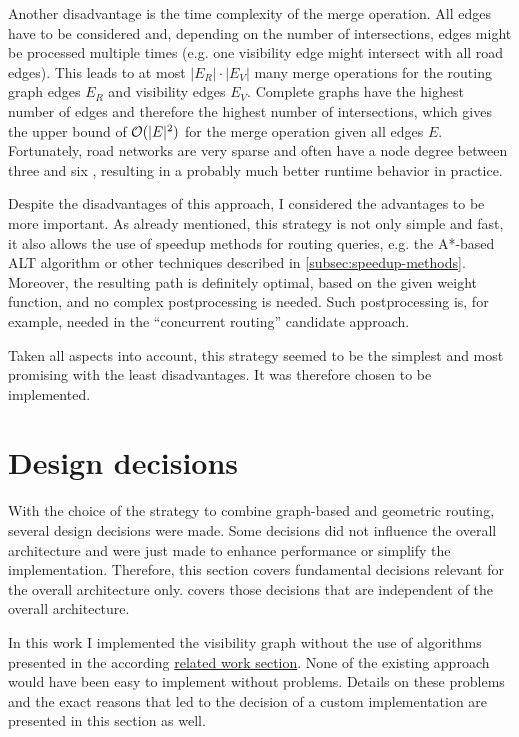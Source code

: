 		Another disadvantage is the time complexity of the merge operation.
		All edges have to be considered and, depending on the number of intersections, edges might be processed multiple times (e.g. one visibility edge might intersect with all road edges).
		This leads to at most $|E_R| \cdot |E_V|$ many merge operations for the routing graph edges $E_R$ and visibility edges $E_V$.
		Complete graphs have the highest number of edges and therefore the highest number of intersections, which gives the upper bound of $\mathcal{O}(|E|^2)$ for the merge operation given all edges $E$.
		Fortunately, road networks are very sparse and often have a node degree between three and six \cite{zhao-analysis-osm-bejing}\cite{boeing-osmnx}, resulting in a probably much better runtime behavior in practice.
		
		Despite the disadvantages of this approach, I considered the advantages to be more important.
		As already mentioned, this strategy is not only simple and fast, it also allows the use of speedup methods for routing queries, e.g. the A*-based ALT algorithm or other techniques described in \cref{subsec:speedup-methods}.
		Moreover, the resulting path is definitely optimal, based on the given weight function, and no complex postprocessing is needed.
		Such postprocessing is, for example, needed in the \enquote{concurrent routing} candidate approach.
		
		Taken all aspects into account, this strategy seemed to be the simplest and most promising with the least disadvantages.
		It was therefore chosen to be implemented.

\section{Design decisions}
\label{sec:design-decisions}

	With the choice of the strategy to combine graph-based and geometric routing, several design decisions were made.
	Some decisions did not influence the overall architecture and were just made to enhance performance or simplify the implementation.
	Therefore, this section covers fundamental decisions relevant for the overall architecture only.
	 covers those decisions that are independent of the overall architecture.
	
	In this work I implemented the visibility graph without the use of algorithms presented in the according \hyperref[subsec:related-work:visibility-graph]{related work section}.
	None of the existing approach would have been easy to implement without problems.
	Details on these problems and the exact reasons that led to the decision of a custom implementation are presented in this section as well.
	

